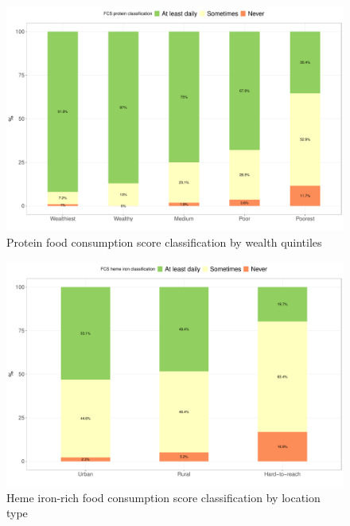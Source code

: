 \documentclass[12pt,a4paper]{article}
\begin{document}
\begin{figure}[H]

{\centering \includegraphics{kayinReport_files/figure-latex/fcsn4plot-1} 

}

\caption{Protein food consumption score classification by wealth quintiles}\label{fig:fcsn4plot}
\end{figure}

\begin{figure}[H]

{\centering \includegraphics{kayinReport_files/figure-latex/fcsn5plot-1} 

}

\caption{Heme iron-rich food consumption score classification by location type}\label{fig:fcsn5plot}
\end{figure}
\end{document}
